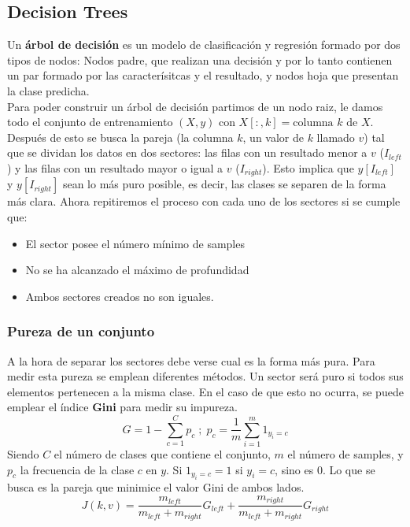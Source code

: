 \documentclass[11pt]{article}
\theoremstyle{plain}
\begin{document}
        \subsection{Decision Trees} %
        \label{sub:decision_trees}
            Un \textbf{árbol de decisión} es un modelo de clasificación y regresión formado por dos tipos de nodos: Nodos padre, que realizan una decisión y por lo tanto contienen un par formado por las caracterísitcas y el resultado, y nodos hoja que presentan la clase predicha.\\

            Para poder construir un árbol de decisión partimos de un nodo raiz, le damos todo el conjunto de entrenamiento $(X,y)$ con $X[:,k] = \text{columna $k$ de $X$}$. Después de esto se busca la pareja (la columna $k$, un valor de $k$ llamado $v$) tal que se dividan los datos en dos sectores: las filas con un resultado menor a $v$ ($I_{left}$) y las filas con un resultado mayor o igual a $v$ ($I_{right}$). Esto implica que $y[I_{left}]$ y $y[I_{right}]$ sean lo más puro posible, es decir, las clases se separen de la forma más clara. Ahora repitiremos el proceso con cada uno de los sectores si se cumple que:
            \begin{itemize}
                \item El sector posee el número mínimo de samples
                \item No se ha alcanzado el máximo de profundidad
                \item Ambos sectores creados no son iguales. 
            \end{itemize}

            \subsubsection{Pureza de un conjunto} %
            \label{subsub:pureza_de_un_conjunto}
                A la hora de separar los sectores debe verse cual es la forma más pura. Para medir esta pureza se emplean diferentes métodos. Un sector será puro si todos sus elementos pertenecen a la misma clase. En el caso de que esto no ocurra, se puede emplear el índice \textbf{Gini} para medir su impureza.
                \begin{equation}
                    G = 1 - \sum_{c=1}^{C} p_c  \; {;} \;  p_c = \frac{1}{m} \sum_{i=1}^{m} 1_{y_i = c}
                \end{equation}
                Siendo $C$ el número de clases que contiene el conjunto, $m$ el número de samples, y $p_c$ la frecuencia de la clase $c$ en $y$. Si $1_{y_i =  c} = 1$ si $y_i = c$, sino es 0. Lo que se busca es la pareja que minimice el valor Gini de ambos lados.
                \[J(k,v) = \frac{m_{left}}{m_{left}+m_{right}} G_{left} + \frac{m_{right}}{m_{left}+m_{right}}G_{right} \tag{Función de coste}\]
\end{document}
